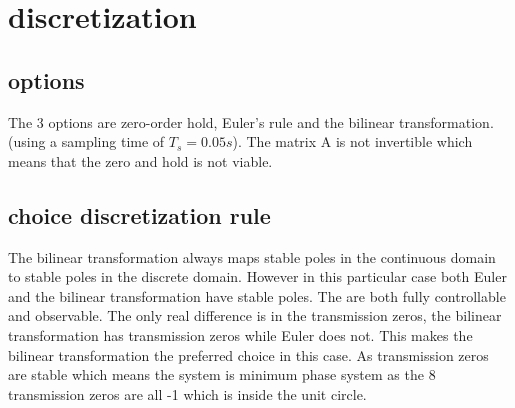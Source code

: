 \section{discretization}
\subsection{options}
The 3 options are zero-order hold, Euler's rule and the bilinear transformation. (using a sampling time of $T_s=0.05s$). The matrix A is not invertible which means that the zero and hold is not viable. 

\subsection{choice discretization rule}
The bilinear transformation always maps stable poles in the continuous domain to stable poles in the discrete domain. However in this particular case both Euler and the bilinear transformation have stable poles. The are both fully controllable and observable. The only real difference is in the transmission zeros, the  bilinear transformation has transmission zeros while Euler does not. This makes the  bilinear transformation the preferred choice in this case. As transmission zeros are stable which means the system is minimum phase system as the 8 transmission zeros are all -1 which is inside the unit circle.